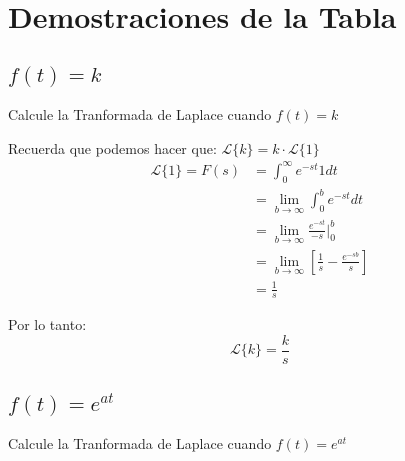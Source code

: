 \documentclass[12pt]{report}                                    %
\begin{document}
    \clearpage
    \section{Demostraciones de la Tabla}

        \subsection{$f(t) = k$}
            Calcule la Tranformada de Laplace cuando $f(t) = k$

            Recuerda que podemos hacer que: $\mathscr{L}\{k\} = k \cdot \mathscr{L}\{1\}$
            \begin{equation*}
            \begin{split}
                \mathscr{L}\{1\} = F(s) 
                            & = \int_0^\infty e^{-st} 1 dt                                              \\
                            & = \lim_{b \to \infty} \int_0^b e^{-st} dt                                 \\
                            & = \lim_{b \to \infty} \frac{e^{-st}}{-s} |_0^b                            \\
                            & = \lim_{b \to \infty} \left[ \frac{1}{s} - \frac{e^{-sb}}{s} \right]      \\
                            & = \frac{1}{s}
            \end{split}
            \end{equation*}

            Por lo tanto:
            \begin{equation}   
                \mathscr{L}\{k\} = \frac{k}{s}
            \end{equation}

        \subsection{$f(t) = e^{at}$}
            Calcule la Tranformada de Laplace cuando $f(t) = e^{at}$
\end{document}
